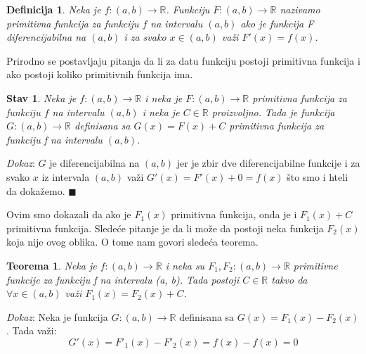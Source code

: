 \documentclass{article}
\newtheorem{definicija}{Definicija}[section]
\newtheorem{teorema}{Teorema}[section]
\newtheorem{stav}{Stav}[section]
\begin{document}
\begin{defbox}
    \begin{definicija}
        Neka je $f:(a, b) \longrightarrow \mathbb{R}$.
        Funkciju $F:(a, b) \longrightarrow \mathbb{R}$ nazivamo primitivna
        funkcija za funkciju $f$ na intervalu $(a, b)$ ako je funkcija F
        diferencijabilna na $(a, b)$ i za svako $x \in (a,b)$ važi
        $F'(x) = f(x)$.
    \end{definicija}
\end{defbox}
Prirodno se postavljaju pitanja da li za datu funkciju postoji
primitivna funkcija i ako postoji koliko primitivnih funkcija ima.
\begin{stavbox}
    \begin{stav}
        Neka je $f: (a, b) \longrightarrow \mathbb{R}$
        i neka je $F: (a,b) \longrightarrow \mathbb{R}$
        primitivna funkcija za funkciju $f$ na intervalu $(a, b)$
        i neka je $C \in \mathbb{R}$ proizvoljno. Tada je
        funkcija $G: (a, b) \longrightarrow \mathbb{R}$
        definisana sa $G(x) = F(x) + C$ primitivna funkcija za
        funkciju f na intervalu $(a, b)$.
    \end{stav}
\end{stavbox}
\textit{Dokaz}: $G$ je diferencijabilna na $(a, b)$ jer je zbir dve
diferencijabilne funkcije i za svako $x$ iz intervala $(a, b)$ važi $G'(x) = F'(x) + 0 = f(x)$
što smo i hteli da dokažemo.
\null\hfill $\blacksquare$ \par
Ovim smo dokazali da ako je $F_1(x)$ primitivna funkcija, onda
je i $F_1(x)+C$ primitivna funkcija. Sledeće pitanje je da li
može da postoji neka funkcija $F_2(x)$ koja nije ovog oblika.
O tome nam govori sledeća teorema.
\begin{teoremabox}
    \begin{teorema}
        Neka je $f: (a, b) \longrightarrow \mathbb{R}$ i
        neka su $F_1, F_2: (a,b) \longrightarrow \mathbb{R}$
        primitivne funkcije za funkciju f na intervalu (a, b).
        Tada postoji $C \in \mathbb{R}$ takvo da
        $\forall x \in (a, b)$ važi $F_1(x) = F_2(x) + C$.
    \end{teorema}
\end{teoremabox}

\textit{Dokaz}: Neka je funkcija $G: (a, b) \longrightarrow \mathbb{R}$
definisana sa $G(x) = F_1(x) - F_2(x)$. Tada važi:
\begin{equation*}
    G'(x) = F'_1(x) - F'_2(x) = f(x) - f(x) = 0
\end{equation*}
\end{document}
